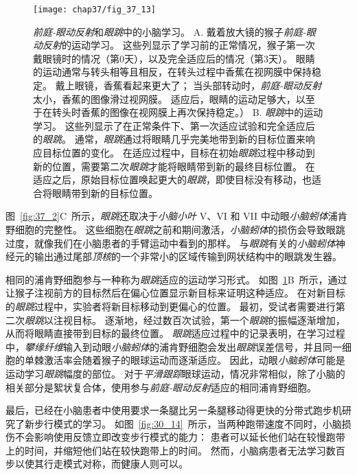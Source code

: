\begin{figure}[htbp]
	\centering
	\texttt{[image: chap37/fig\_37\_13]}
	\caption{\textit{前庭-眼动反射}和\textit{眼跳}中的小脑学习。
		A. 戴着放大镜的猴子\textit{前庭-眼动反射}的运动学习。
		这些列显示了学习前的正常情况，猴子第一次戴眼镜时的情况（第0天），以及完全适应后的情况（第3天）。
		眼睛的运动通常与转头相等且相反，在转头过程中香蕉在视网膜中保持稳定。
		戴上眼镜，香蕉看起来更大了；
		当头部转动时，\textit{前庭-眼动反射}太小，香蕉的图像滑过视网膜。
		适应后，眼睛的运动足够大，以至于在转头时香蕉的图像在视网膜上再次保持稳定\cite{lisberger1988neural}。）
		B. \textit{眼跳}中的运动学习。
		这些列显示了在正常条件下、第一次适应试验和完全适应后的\textit{眼跳}。
		通常，\textit{眼跳}通过将眼睛几乎完美地带到新的目标位置来响应目标位置的变化。
		在适应过程中，目标在初始\textit{眼跳}过程中移动到新的位置，需要第二次\textit{眼跳}才能将眼睛带到新的最终目标位置。
		在适应之后，原始目标位置唤起更大的\textit{眼跳}，即使目标没有移动，也适合将眼睛带到新的目标位置。}
	\label{fig:37_13}
\end{figure}


图~\ref{fig:37_2}C~所示，\textit{眼跳}还取决于\textit{小脑小叶} V、VI 和 VII 中动眼\textit{小脑蚓体}浦肯野细胞的完整性。
这些细胞在\textit{眼跳}之前和期间激活，\textit{小脑蚓体}的损伤会导致眼跳过度，就像我们在小脑患者的手臂运动中看到的那样。
与\textit{眼跳}有关的\textit{小脑蚓体}神经元的输出通过尾部\textit{顶核}的一个非常小的区域传输到网状结构中的眼跳发生器。


相同的浦肯野细胞参与一种称为\textit{眼跳}适应的运动学习形式。
如图~\ref{fig:37_13}B~所示，通过让猴子注视前方的目标然后在偏心位置显示新目标来证明这种适应。
在对新目标的\textit{眼跳}过程中，实验者将新目标移动到更偏心的位置。
最初，受试者需要进行第二次\textit{眼跳}以注视目标。
逐渐地，经过数百次试验，第一个\textit{眼跳}的振幅逐渐增加，从而将眼睛直接带到目标的最终位置。
\textit{眼跳}适应过程中的记录表明，在学习过程中，\textit{攀缘纤维}输入到动眼\textit{小脑蚓体}的浦肯野细胞会发出\textit{眼跳}误差信号，并且同一细胞的单棘激活率会随着猴子的眼球运动而逐渐适应。
因此，动眼\textit{小脑蚓体}可能是运动学习\textit{眼跳}幅度的部位。
对于\textit{平滑跟踪}眼球运动，情况非常相似，除了小脑的相关部分是絮状复合体，使用参与\textit{前庭-眼动反射}适应的相同浦肯野细胞。


最后，已经在小脑患者中使用要求一条腿比另一条腿移动得更快的分带式跑步机研究了新步行模式的学习。
如图~\ref{fig:30_14}~所示，当两种跑带速度不同时，小脑损伤不会影响使用反馈立即改变步行模式的能力：
患者可以延长他们站在较慢跑带上的时间，并缩短他们站在较快跑带上的时间。
然而，小脑病患者无法学习数百步以使其行走模式对称，而健康人则可以。



